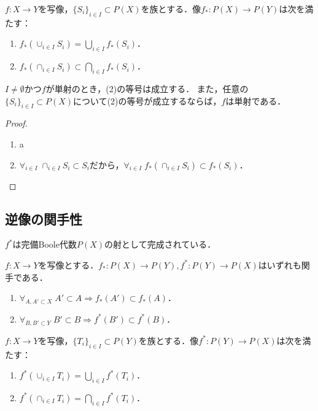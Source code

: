 \documentclass[uplatex,dvipdfmx]{jsreport}
\begin{document}
\begin{proposition}[像は和のみを保つ]\label{prop-image-preserve-unions}
    $f:X\to Y$を写像，$\{S_i\}_{i\in I}\subset P(X)$を族とする．像$f_*:P(X)\to P(Y)$は次を満たす：
    \begin{enumerate}
        \item $f_*(\cup_{i\in I}S_i)=\bigcup_{i\in I}f_*(S_i)$．
        \item $f_*(\cap_{i\in I}S_i)\subset\bigcap_{i\in I}f_*(S_i)$．
    \end{enumerate}
    $I\ne\emptyset$かつ$f$が単射のとき，(2)の等号は成立する．
    また，任意の$\{S_i\}_{i\in I}\subset P(X)$について(2)の等号が成立するならば，$f$は単射である．
\end{proposition}
\begin{proof}\mbox{}
    \begin{enumerate}
        \item a
        \item $\forall_{i\in I}\;\cap_{i\in I}S_i\subset S_i$だから，$\forall_{i\in I}\;f_*(\cap_{i\in I}S_i)\subset f_*(S_i)$．
    \end{enumerate}
\end{proof}

\subsection{逆像の関手性}

\begin{tcolorbox}[colframe=ForestGreen, colback=ForestGreen!10!white,breakable,colbacktitle=ForestGreen!40!white,coltitle=black,fonttitle=\bfseries\sffamily,
title=]
    $f^*$は完備Boole代数$P(X)$の射として完成されている．
\end{tcolorbox}

\begin{proposition}[順序の保存]
    $f:X\to Y$を写像とする．$f_*:P(X)\to P(Y),f^*:P(Y)\to P(X)$はいずれも関手である．
    \begin{enumerate}
        \item $\forall_{A,A'\subset X}\;A'\subset A\Rightarrow f_*(A')\subset f_*(A)$．
        \item $\forall_{B,B'\subset Y}\;B'\subset B\Rightarrow f^*(B')\subset f^*(B)$．
    \end{enumerate}
\end{proposition}

\begin{proposition}[逆像は和と積を保つ]
    $f:X\to Y$を写像，$\{T_i\}_{i\in I}\subset P(Y)$を族とする．像$f^*:P(Y)\to P(X)$は次を満たす：
    \begin{enumerate}
        \item $f^*(\cup_{i\in I}T_i)=\bigcup_{i\in I}f^*(T_i)$．
        \item  $f^*(\cap_{i\in I}T_i)=\bigcap_{i\in I}f^*(T_i)$．
    \end{enumerate}
\end{proposition}
\end{document}
